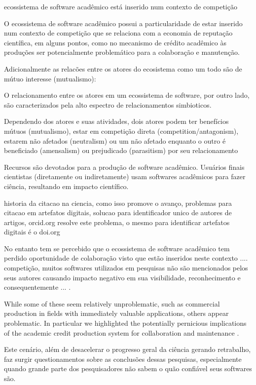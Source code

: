 ecossistema de software acadêmico está inserido num contexto de competição

O ecossistema de software acadêmico possui a particularidade de estar inserido
num contexto de competição que se relaciona com a economia de reputação
científica, em alguns pontos, como no mecanismo de crédito acadêmico às
produções ser potencialmente problemático para a colaboração e manutenção.

Adicionalmente as relacões entre os atores do ecosistema como um todo
são de mútuo interesse (mutualismo):

O relacionamento entre os atores em um ecossistema de software, por outro lado,
são caracterizados pela alto espectro de relacionamentos simbioticos.

Dependendo dos atores e suas atividades, dois atores podem ter benefícios
mútuos (mutualismo), estar em competição direta (competition/antagonism),
estarem não afetados (neutralism) ou um não afetado enquanto o outro é
beneficiado (amensalism) ou prejudicado (parasitism) por seu relacionamento

Recursos são devotados para a produção de software acadêmico. Usuários finais
cientistas (diretamente ou indiretamente) usam softwares acadêmicos para fazer
ciência, resultando em impacto científico. 

historia da citacao na ciencia, como isso promove o avanço, problemas para
citacao em artefatos digitais, solucao para identificador unico de autores de
artigos, orcid.org resolve este problema, o mesmo para identificar artefatos
digitais é o doi.org

No entanto tem se percebido que o ecossistema de software acadêmico tem perdido
oportunidade de colaboração visto que estão inseridos neste contexto ....
competição, muitos softwares utilizados em pesquisas não são mencionados
pelos seus autores causando impacto negativo em sua visibilidade, reconhecimento e
consequentemente ...  \cite{howison2016software}.

While some of these seem relatively unproblematic, such as commercial
production in fields with immediately valuable applications, others appear
problematic. In particular we highlighted the potentially pernicious
implications of the academic credit production system for collaboration and
maintenance \cite{howison2011scientific}.

Este cenário, além de desacelerar o progresso geral da ciência gerando
retrabalho, faz surgir questionamentos sobre as conclusões dessas pesquisas,
especialmente quando grande parte dos pesquisadores não sabem o quão confiável
seus softwares são.

